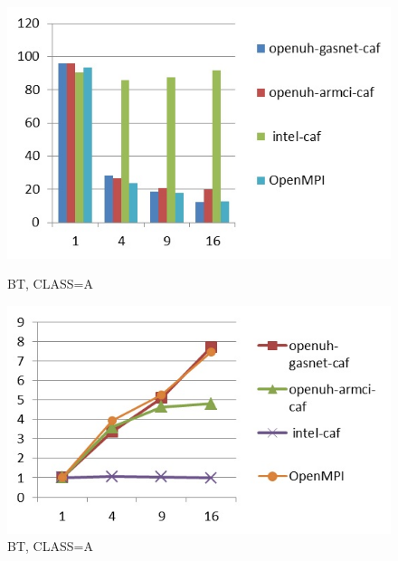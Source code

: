 \begin{figure}[ht]
\begin{minipage}[b]{0.45\linewidth}
\centering
\includegraphics[width=\textwidth]{./figures/bt_A_time.jpg}
\caption{BT, CLASS=A}
\label{fig:figure1}
\end{minipage}
\hspace{0.5cm}
\begin{minipage}[b]{0.45\linewidth}
\centering
\includegraphics[width=\textwidth]{./figures/bt_A_scalability.jpg}
\caption{BT, CLASS=A}
\label{fig:figure2}
\end{minipage}
\end{figure}



